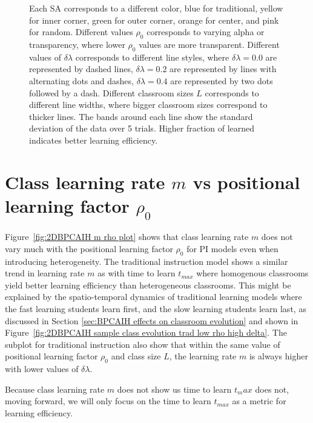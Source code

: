 \begin{figure}[htbp!]
{   Each SA corresponds to a different color, blue for traditional, yellow for inner corner, green for outer corner, orange for center, and pink for random. 
   Different values $\rho_0$ corresponds to varying alpha or transparency, where lower $\rho_0$ values are more transparent.
   Different values of $\delta\lambda$ corresponds to different line styles, where $\delta\lambda=0.0$ are represented by dashed lines, $\delta\lambda=0.2$ are represented by lines with alternating dots and dashes, $\delta\lambda=0.4$ are represented by two dots followed by a dash.
   Different classroom sizes $L$ corresponds to different line widths, where bigger classroom sizes correspond to thicker lines.
   The bands around each line show the standard deviation of the data over 5 trials.
   Higher fraction of learned indicates better learning efficiency.
   }
   \label{fig:2DBPCAIH t-learned comparisons}
\end{figure}

\newpage %

\section{Class learning rate $m$ vs positional learning factor $\rho_0$}\label{sec:BPCAIH m vs rho}

Figure~\ref{fig:2DBPCAIH m rho plot} shows that class learning rate $m$ does not vary much with the positional learning factor $\rho_0$ for PI models even when introducing heterogeneity.
The traditional instruction model shows a similar trend in learning rate $m$ as with time to learn $t_{max}$ where homogenous classrooms yield better learning efficiency than heterogeneous classrooms.
This might be explained by the spatio-temporal dynamics of traditional learning models where the fast learning students learn first, and the slow learning students learn last, as discussed in Section \ref{sec:BPCAIH effects on classroom evolution} and shown in Figure~\ref{fig:2DBPCAIH sample class evolution trad low rho high delta}.
The subplot for traditional instruction also show that within the same value of positional learning factor $\rho_0$ and class size $L$, the learning rate $m$ is always higher with lower values of $\delta\lambda$.

Because class learning rate $m$ does not show us time to learn $t_max$ does not, moving forward, we will only focus on the time to learn $t_{max}$ as a metric for learning efficiency.

